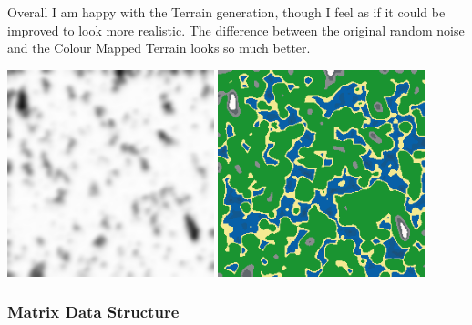 \begin{flushleft}
            Overall I am happy with the Terrain generation, though I feel as if it could be improved to look more realistic.
            The difference between the original random noise and the Colour Mapped Terrain looks so much better.

            \begin{center}
                \includegraphics[width=6cm]{Images/Prototype/Seed420 Grayscale.png}
                \includegraphics[width=6cm]{Images/Prototype/Seed420 Colour.png} 
            \end{center}
            
            \vspace{1cm}
            \subsubsection{Matrix Data Structure}
            \vspace{0.25cm}


\end{flushleft}
